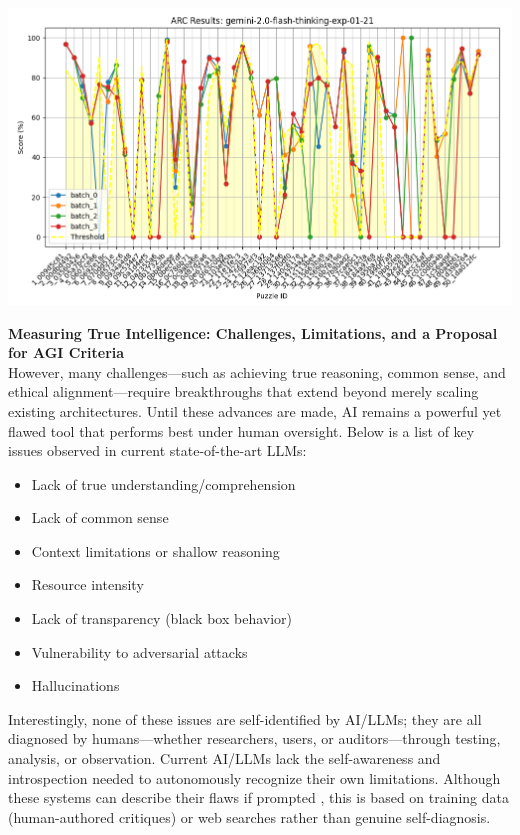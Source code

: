 \documentclass[11pt]{scrartcl}
\begin{document}
\includegraphics[width=0.99\linewidth, center]{gemini-2.0-flash-thinking-exp-01-21.png}

\vspace{2cm}

\textbf{Measuring True Intelligence: Challenges, Limitations, and a Proposal for AGI Criteria} \\
However, many challenges—such as achieving true reasoning, common sense, and ethical alignment—require breakthroughs that extend beyond merely scaling existing architectures. Until these advances are made, AI remains a powerful yet flawed tool that performs best under human oversight. Below is a list of key issues observed in current state-of-the-art LLMs:
\begin{itemize}
    \item Lack of true understanding/comprehension
    \item Lack of common sense
    \item Context limitations or shallow reasoning
    \item Resource intensity
    \item Lack of transparency (black box behavior)
    \item Vulnerability to adversarial attacks
    \item Hallucinations
\end{itemize}
Interestingly, none of these issues are self-identified by AI/LLMs; they are all diagnosed by humans—whether researchers, users, or auditors—through testing, analysis, or observation. Current AI/LLMs lack the self-awareness and introspection \cite{ref13} needed to autonomously recognize their own limitations. Although these systems can describe their flaws if prompted \cite{ref14}, this is based on training data (human-authored critiques) or web searches rather than genuine self-diagnosis. \\
\end{document}
